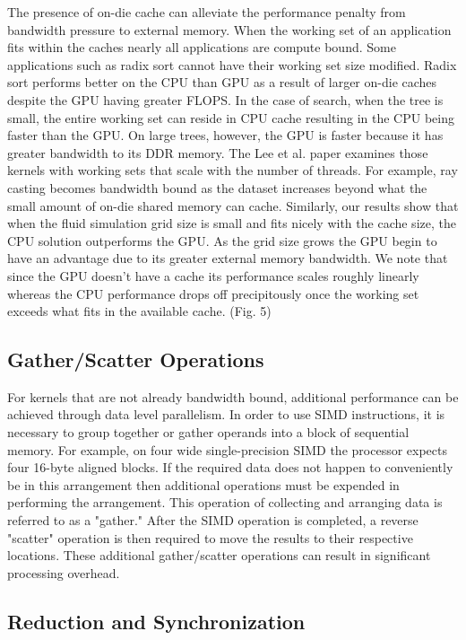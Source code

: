 \documentclass[conference]{IEEEtran}
\begin{document}
The presence of on-die cache can alleviate the performance penalty from bandwidth pressure to external memory. When the working set of an application fits within the caches nearly all applications are compute bound. Some applications such as radix sort cannot have their working set size modified. Radix sort performs better on the CPU than GPU as a result of larger on-die caches despite the GPU having greater FLOPS. In the case of search, when the tree is small, the entire working set can reside in CPU cache resulting in the CPU being faster than the GPU. On large trees, however, the GPU is faster because it has greater bandwidth to its DDR memory. The Lee et al. paper examines those kernels with working sets that scale with the number of threads. For example, ray casting becomes bandwidth bound as the dataset increases beyond what the small amount of on-die shared memory can cache. Similarly, our results show that when the fluid simulation grid size is small and fits nicely with the cache size, the CPU solution outperforms the GPU. As the grid size grows the GPU begin to have an advantage due to its greater external memory bandwidth. We note that since the GPU doesn't have a cache its performance scales roughly linearly whereas the CPU performance drops off precipitously once the working set exceeds what fits in the available cache. (Fig. 5)

\subsection{Gather/Scatter Operations}

For kernels that are not already bandwidth bound, additional performance can be achieved through data level parallelism. In order to use SIMD instructions, it is necessary to group together  or gather operands into a block of sequential memory. For example, on four wide single-precision SIMD the processor expects four 16-byte aligned blocks. If the required data does not happen to conveniently be in this arrangement then additional operations must be expended in performing the arrangement. This operation of collecting and arranging data is referred to as a "gather." After the SIMD operation is completed, a reverse "scatter" operation is then required to move the results to their respective locations. These additional gather/scatter operations can result in significant processing overhead.

\subsection{Reduction and Synchronization}
\end{document}
